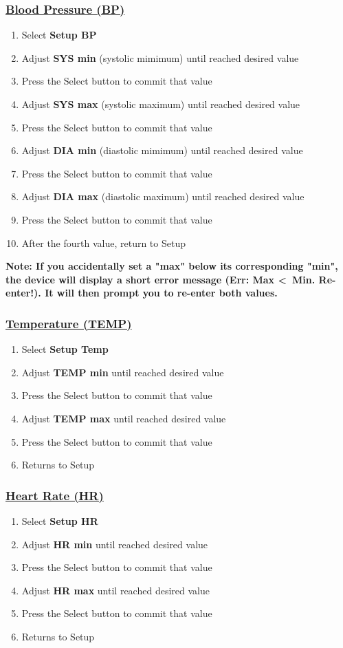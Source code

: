 \subsubsection{\underline{Blood Pressure (BP)}}
\begin{enumerate}
	\item Select \textbf{Setup BP}
	\item Adjust \textbf{SYS min} (systolic mimimum) until reached desired value
	\item Press the Select button to commit that value
	\item Adjust \textbf{SYS max} (systolic maximum) until reached desired value
	\item Press the Select button to commit that value
	\item Adjust \textbf{DIA min} (diastolic mimimum) until reached desired value
	\item Press the Select button to commit that value
	\item Adjust \textbf{DIA max} (diastolic maximum) until reached desired value
	\item Press the Select button to commit that value
	\item After the fourth value, return to Setup
\end{enumerate}
\textbf{Note: If you accidentally set a "max" below its corresponding "min", the device will display a short error message (Err: Max \textless\ Min. Re-enter!). It will then prompt you to re-enter both values.}
\subsubsection{\underline{Temperature (TEMP)}}
\begin{enumerate}
	\item Select \textbf{Setup Temp}
	\item Adjust \textbf{TEMP min} until reached desired value
	\item Press the Select button to commit that value
	\item Adjust \textbf{TEMP max} until reached desired value
	\item Press the Select button to commit that value
	\item Returns to Setup
\end{enumerate}
\subsubsection{\underline{Heart Rate (HR)}}
\begin{enumerate}
	\item Select \textbf{Setup HR}
	\item Adjust \textbf{HR min} until reached desired value
	\item Press the Select button to commit that value
	\item Adjust \textbf{HR max} until reached desired value
	\item Press the Select button to commit that value
	\item Returns to Setup
\end{enumerate}

